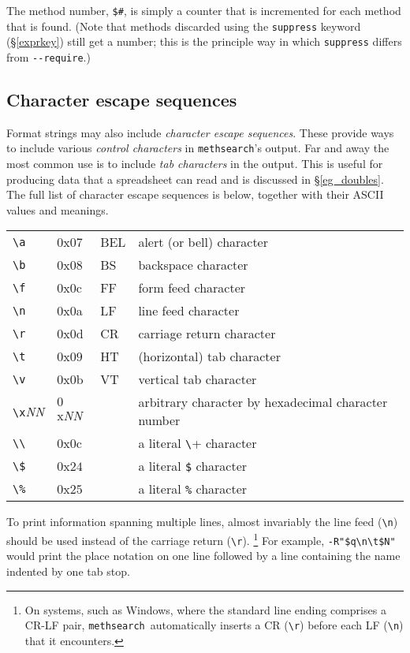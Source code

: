\documentclass[a4paper,11pt,oneside]{book}
\def\textitidx#1{\textit{#1}\index{#1}}
\def\methsearch{\texttt{meth\-search}}
\newcommand{\sref}[1]{\hyperref[#1]{\S\ref{#1}}}
\begin{document}
The method number, \verb+$#+, is simply a counter that is incremented for 
each method that is found.  (Note that methods discarded using the 
\verb+suppress+ keyword (\sref{exprkey})%
still get a number; this is the principle way in which \verb+suppress+
differs from \verb+--require+.)

\subsection{Character escape sequences}\label{charesc}

Format strings may also include \textit{character escape sequences}.  
These provide ways to include various \textitidx{control characters} in 
\methsearch's output.  Far and away the most common use is to include
\textit{tab characters} in the output.  This is useful
for producing data that a spreadsheet can read
and is discussed in \sref{eg_doubles}.
The full list of character escape sequences is below,
together with their ASCII values and meanings. 

\begin{tabular}{llll}
\verb+\a+& $0$x$07$& BEL& alert (or bell) character\\
\verb+\b+& $0$x$08$& BS&  backspace character\\
\verb+\f+& $0$x$0$c& FF&  form feed character\\
\verb+\n+& $0$x$0$a& LF&  line feed character\\
\verb+\r+& $0$x$0$d& CR&  carriage return character\\
\verb+\t+& $0$x$09$& HT&  (horizontal) tab character\\
\verb+\v+& $0$x$0$b& VT&  vertical tab character\\
\verb+\x+\textit{NN}  &$0$x\textit{NN}&
  &arbitrary character by hexadecimal character number\\
\verb+\\+& $0$x$0$c&   &  a literal \verb+\+ character\\
\verb+\$+& $0$x$24$&   &  a literal \verb+$+ character\\
\verb+\%+& $0$x$25$&   &  a literal \verb+%+ character\\
\end{tabular}

To print information spanning multiple lines, almost invariably the
line feed (\verb+\n+) should be used instead of the 
carriage return (\verb+\r+).%
\footnote{On systems, such as Windows, where the standard
line ending comprises a CR-LF pair,
\methsearch\ automatically inserts a CR (\verb+\r+) before each LF (\verb+\n+) 
that it encounters.}  For example, \verb+-R"$q\n\t$N"+ would print the 
place notation on one line followed by a line containing the name 
indented by one tab stop.
\end{document}

